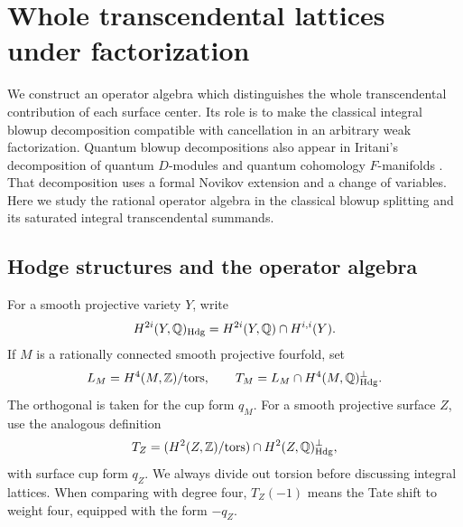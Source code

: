 \section{Whole transcendental lattices under factorization}\label{gw:section}

We construct an operator algebra which distinguishes the whole transcendental
contribution of each surface center.  Its role is to make the classical
integral blowup decomposition compatible with cancellation in an arbitrary
weak factorization.
Quantum blowup decompositions also appear in Iritani's decomposition of
quantum $D$-modules and quantum cohomology $F$-manifolds
\cite[Theorem~1.1 and Corollary~1.2]{Iritani25}.
That decomposition uses a formal Novikov extension and a change of
variables. Here we study the rational operator algebra in the classical
blowup splitting and its saturated integral transcendental summands.

\subsection{Hodge structures and the operator algebra}

For a smooth projective variety $Y$, write
\[
 H^{2i}(Y,\mathbb Q)_{\mathrm{Hdg}}
 =H^{2i}(Y,\mathbb Q)\cap H^{i,i}(Y).
\]
If $M$ is a rationally connected smooth projective fourfold, set
\[
 L_M=H^4(M,\mathbb Z)/\mathrm{tors},\qquad
 T_M=L_M\cap H^4(M,\mathbb Q)_{\mathrm{Hdg}}^{\perp}.
\]
The orthogonal is taken for the cup form $q_M$.  For a smooth projective
surface $Z$, use the analogous definition
\[
 T_Z=(H^2(Z,\mathbb Z)/\mathrm{tors})\cap
              H^2(Z,\mathbb Q)_{\mathrm{Hdg}}^{\perp},
\]
with surface cup form $q_Z$.  We always divide out torsion before discussing
integral lattices.  When comparing with degree four, $T_Z(-1)$ means the Tate
shift to weight four, equipped with the form $-q_Z$.

